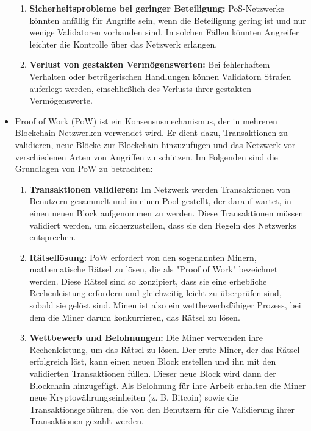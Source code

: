 \begin{itemize}
\begin{enumerate}
		\item \textbf{Sicherheitsprobleme bei geringer Beteiligung:} PoS-Netzwerke könnten anfällig für Angriffe sein, wenn die Beteiligung gering ist und nur wenige Validatoren vorhanden sind. In solchen Fällen könnten Angreifer leichter die Kontrolle über das Netzwerk erlangen.
		
		\item \textbf{Verlust von gestakten Vermögenswerten:} Bei fehlerhaftem Verhalten oder betrügerischen Handlungen können Validatorn Strafen auferlegt werden, einschließlich des Verlusts ihrer gestakten Vermögenswerte.
	\end{enumerate}
	
	\item Proof of Work (PoW) ist ein Konsensusmechanismus, der in mehreren Blockchain-Netzwerken verwendet wird. Er dient dazu, Transaktionen zu validieren, neue Blöcke zur Blockchain hinzuzufügen und das Netzwerk vor verschiedenen Arten von Angriffen zu schützen. Im Folgenden sind die Grundlagen von PoW zu betrachten:
	
	\begin{enumerate}[label=\arabic*.]
		\item \textbf{Transaktionen validieren:} Im Netzwerk werden Transaktionen von Benutzern gesammelt und in einen Pool gestellt, der darauf wartet, in einen neuen Block aufgenommen zu werden. Diese Transaktionen müssen validiert werden, um sicherzustellen, dass sie den Regeln des Netzwerks entsprechen.
		
		\item \textbf{Rätsellösung:} PoW erfordert von den sogenannten Minern, mathematische Rätsel zu lösen, die als "Proof of Work" bezeichnet werden. Diese Rätsel sind so konzipiert, dass sie eine erhebliche Rechenleistung erfordern und gleichzeitig leicht zu überprüfen sind, sobald sie gelöst sind. Minen ist also ein wettbewerbsfähiger Prozess, bei dem die Miner darum konkurrieren, das Rätsel zu lösen.
		
		\item \textbf{Wettbewerb und Belohnungen:} Die Miner verwenden ihre Rechenleistung, um das Rätsel zu lösen. Der erste Miner, der das Rätsel erfolgreich löst, kann einen neuen Block erstellen und ihn mit den validierten Transaktionen füllen. Dieser neue Block wird dann der Blockchain hinzugefügt. Als Belohnung für ihre Arbeit erhalten die Miner neue Kryptowährungseinheiten (z. B. Bitcoin) sowie die Transaktionsgebühren, die von den Benutzern für die Validierung ihrer Transaktionen gezahlt werden.
		

\end{enumerate}
\end{itemize}
